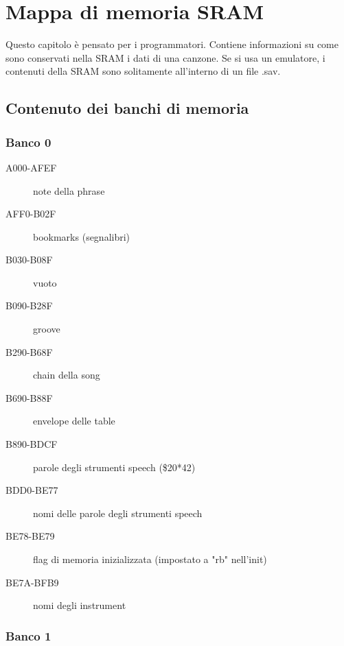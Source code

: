 \chapter{Mappa di memoria SRAM}

Questo capitolo è pensato per i programmatori. Contiene informazioni su come sono conservati nella SRAM i dati di una canzone. Se si usa un emulatore, i contenuti della SRAM sono solitamente all'interno di un file .sav.

\section{Contenuto dei banchi di memoria}

\subsection{Banco 0}

\begin{description}
    \item[A000-AFEF] note della phrase
    \item[AFF0-B02F] bookmarks (segnalibri)
    \item[B030-B08F] vuoto
    \item[B090-B28F] groove
    \item[B290-B68F] chain della song
    \item[B690-B88F] envelope delle table
    \item[B890-BDCF] parole degli strumenti speech (\$20*42)
    \item[BDD0-BE77] nomi delle parole degli strumenti speech
    \item[BE78-BE79] flag di memoria inizializzata (impostato a "rb" nell'init)
    \item[BE7A-BFB9] nomi degli instrument
\end{description}

\subsection{Banco 1}

